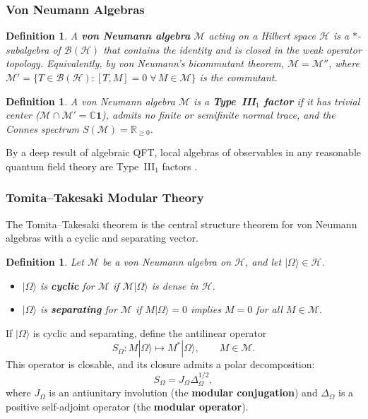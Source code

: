 \documentclass[12pt,a4paper,openany]{book}
\newtheorem{definition}[theorem]{Definition}
\begin{document}
\subsubsection{Von Neumann Algebras}

\begin{definition}
A \textbf{von Neumann algebra} $\mathcal{M}$ acting on a Hilbert space $\mathcal{H}$ is a $*$-subalgebra of $\mathcal{B}(\mathcal{H})$ that contains the identity and is closed in the weak operator topology.
Equivalently, by von Neumann's bicommutant theorem, $\mathcal{M} = \mathcal{M}''$, where $\mathcal{M}' = \{T \in \mathcal{B}(\mathcal{H}) : [T, M] = 0 \;\forall\, M \in \mathcal{M}\}$ is the commutant.
\end{definition}

\begin{definition}
A von Neumann algebra $\mathcal{M}$ is a \textbf{Type~III$_1$ factor} if it has trivial center ($\mathcal{M} \cap \mathcal{M}' = \mathbb{C} \mathbf{1}$), admits no finite or semifinite normal trace, and the Connes spectrum $S(\mathcal{M}) = \mathbb{R}_{\geq 0}$.
\end{definition}

By a deep result of algebraic QFT, local algebras of observables in any reasonable quantum field theory are Type~III$_1$ factors \cite{Haag1996, Yngvason2005}.

\subsubsection{Tomita--Takesaki Modular Theory}
\label{D-sec:TT}

The Tomita--Takesaki theorem is the central structure theorem for von Neumann algebras with a cyclic and separating vector.

\begin{definition}
Let $\mathcal{M}$ be a von Neumann algebra on $\mathcal{H}$, and let $|\Omega\rangle \in \mathcal{H}$.
\begin{itemize}
\item $|\Omega\rangle$ is \textbf{cyclic} for $\mathcal{M}$ if $\mathcal{M}|\Omega\rangle$ is dense in $\mathcal{H}$.
\item $|\Omega\rangle$ is \textbf{separating} for $\mathcal{M}$ if $M|\Omega\rangle = 0$ implies $M = 0$ for all $M \in \mathcal{M}$.
\end{itemize}
\end{definition}

If $|\Omega\rangle$ is cyclic and separating, define the antilinear operator
\begin{equation}
S_\Omega : M|\Omega\rangle \mapsto M^*|\Omega\rangle, \qquad M \in \mathcal{M}.
\end{equation}
This operator is closable, and its closure admits a polar decomposition:
\begin{equation}
S_\Omega = J_\Omega \Delta_\Omega^{1/2},
\end{equation}
where $J_\Omega$ is an antiunitary involution (the \textbf{modular conjugation}) and $\Delta_\Omega$ is a positive self-adjoint operator (the \textbf{modular operator}).
\end{document}
